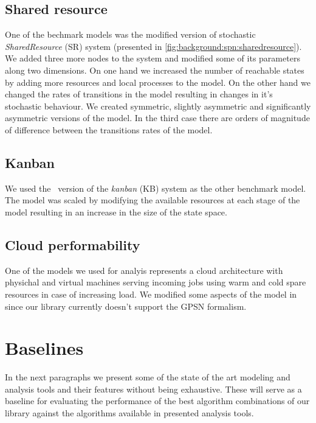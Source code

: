 \subsection{Shared resource}

One of the bechmark models was the modified version of stochastic \emph{SharedResource} (SR) system (presented in \cref{fig:background:spn:sharedresource}). We added three more nodes to the system and modified some of its parameters along two dimensions. On one hand we increased the number of reachable states by adding more resources and local processes to the model. On the other hand we changed the rates of transitions in the model resulting in changes in it's stochastic  behaviour. We created symmetric, slightly asymmetric and significantly asymmetric versions of the model. In the third case there are orders of magnitude of difference between the transitions rates of the model.  

\subsection{Kanban}

We used the \SPN\ version of the \emph{kanban} (KB) system \citep{ciardo2003logical} as the other benchmark model. The model was scaled by modifying the available resources at each stage of the model resulting in an increase in the size of the state space.

\subsection{Cloud performability}

One of the models we used for analyis represents a cloud architecture \citep{ghosh2012scalable} with physichal and virtual machines serving incoming jobs using warm and cold spare resources in case of increasing load. We modified some aspects of the model in \citep{ghosh2012scalable} since our library currently doesn't support the GPSN formalism.

\section{Baselines}

In the next paragraphs we present some of the state of the art modeling and analysis tools and their features without being exhaustive. These will serve as a baseline for evaluating the performance of the best algorithm combinations of our library against the algorithms available in presented analysis tools.

